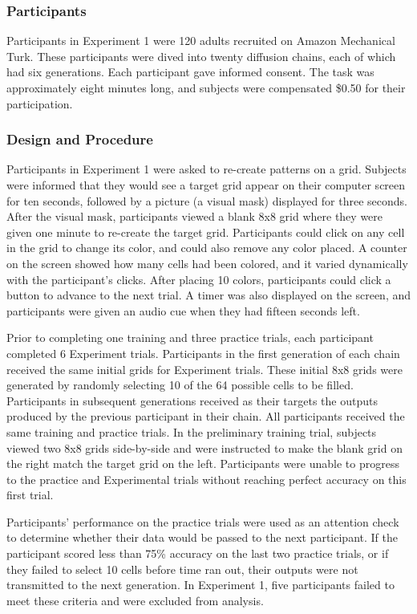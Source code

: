 \documentclass[10pt, letterpaper]{article}
\begin{document}
\subsubsection{Participants}\label{participants}

Participants in Experiment 1 were 120 adults recruited on Amazon
Mechanical Turk. These participants were dived into twenty diffusion
chains, each of which had six generations. Each participant gave
informed consent. The task was approximately eight minutes long, and
subjects were compensated \$0.50 for their participation.

\subsubsection{Design and Procedure}\label{design-and-procedure}

Participants in Experiment 1 were asked to re-create patterns on a grid.
Subjects were informed that they would see a target grid appear on their
computer screen for ten seconds, followed by a picture (a visual mask)
displayed for three seconds. After the visual mask, participants viewed
a blank 8x8 grid where they were given one minute to re-create the
target grid. Participants could click on any cell in the grid to change
its color, and could also remove any color placed. A counter on the
screen showed how many cells had been colored, and it varied dynamically
with the participant's clicks. After placing 10 colors, participants
could click a button to advance to the next trial. A timer was also
displayed on the screen, and participants were given an audio cue when
they had fifteen seconds left.

Prior to completing one training and three practice trials, each
participant completed 6 Experiment trials. Participants in the first
generation of each chain received the same initial grids for Experiment
trials. These initial 8x8 grids were generated by randomly selecting 10
of the 64 possible cells to be filled. Participants in subsequent
generations received as their targets the outputs produced by the
previous participant in their chain. All participants received the same
training and practice trials. In the preliminary training trial,
subjects viewed two 8x8 grids side-by-side and were instructed to make
the blank grid on the right match the target grid on the left.
Participants were unable to progress to the practice and Experimental
trials without reaching perfect accuracy on this first trial.

Participants' performance on the practice trials were used as an
attention check to determine whether their data would be passed to the
next participant. If the participant scored less than 75\% accuracy on
the last two practice trials, or if they failed to select 10 cells
before time ran out, their outputs were not transmitted to the next
generation. In Experiment 1, five participants failed to meet these
criteria and were excluded from analysis.
\end{document}
